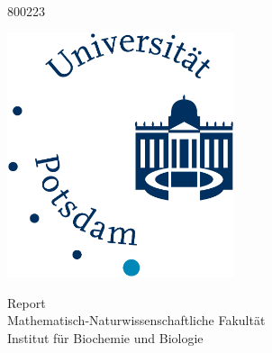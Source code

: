 
\begin{titlepage}
    \begin{center}
        {\LARGE  

        \hfill

        \vfill

        {} \\ 
        \smallskip
	 {800223} \\ 
	 \bigskip
	
        {\color{Maroon}} 

        }

        \vfill

        \includegraphics[width=0.5\textwidth]{Frontpage/Mathnatlogo} \\ \bigskip

	 \vfill

		Report\\
		Mathematisch-Naturwissenschaftliche Fakult\"{a}t\\
		Institut für Biochemie und Biologie\\


        \vfill                      

    \end{center}        
\end{titlepage} 